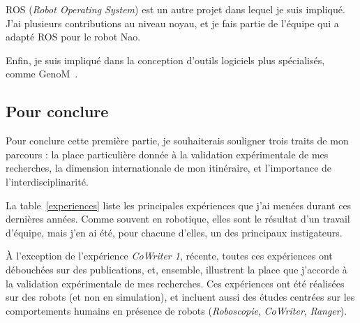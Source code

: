 \documentclass[a4paper]{article}
\begin{document}
ROS (\emph{Robot Operating System}) est un autre projet dans lequel je suis
impliqué.  J'ai plusieurs contributions au niveau noyau, et je fais partie de
l'équipe qui a adapté ROS pour le robot Nao.

Enfin, je suis impliqué dans la conception d'outils logiciels plus spécialisés,
comme GenoM~\cite{mallet2010genom3}.

\subsection{Pour conclure}

Pour conclure cette première partie, je souhaiterais souligner trois traits de
mon parcours : la place particulière donnée à la validation expérimentale de mes recherches, la dimension internationale de mon itinéraire, et l'importance de
l'interdisciplinarité.

La table~\ref{experiences} liste les principales expériences que j'ai menées
durant ces dernières années. Comme souvent en robotique, elles sont le résultat
d'un travail d'équipe, mais j'en ai été, pour chacune d'elles, un des
principaux instigateurs.

À l'exception de l'expérience \emph{CoWriter 1}, récente, toutes ces expériences
ont débouchées sur des publications, et, ensemble, illustrent la place que
j'accorde à la validation expérimentale de mes recherches. Ces expériences ont
été réalisées sur des robots (et non en simulation), et incluent aussi des
études centrées sur les comportements humains en présence de robots
(\emph{Roboscopie}, \emph{CoWriter}, \emph{Ranger}).
\end{document}
